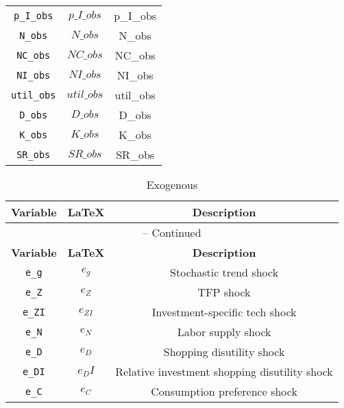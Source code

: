 \begin{center}
\begin{longtable}{ccc}
\texttt{p\_I\_obs} & $p\_I\_obs$ & p\_I\_obs\\
\texttt{N\_obs} & $N\_obs$ & N\_obs\\
\texttt{NC\_obs} & $NC\_obs$ & NC\_obs\\
\texttt{NI\_obs} & $NI\_obs$ & NI\_obs\\
\texttt{util\_obs} & $util\_obs$ & util\_obs\\
\texttt{D\_obs} & $D\_obs$ & D\_obs\\
\texttt{K\_obs} & $K\_obs$ & K\_obs\\
\texttt{SR\_obs} & $SR\_obs$ & SR\_obs\\
\hline%
\end{longtable}
\end{center}
\begin{center}
\begin{longtable}{ccc}
\caption{Exogenous}\\%
\hline%
\multicolumn{1}{c}{\textbf{Variable}} &
\multicolumn{1}{c}{\textbf{\LaTeX}} &
\multicolumn{1}{c}{\textbf{Description}}\\%
\hline\hline%
\endfirsthead
\multicolumn{3}{c}{{\tablename} \thetable{} -- Continued}\\%
\hline%
\multicolumn{1}{c}{\textbf{Variable}} &
\multicolumn{1}{c}{\textbf{\LaTeX}} &
\multicolumn{1}{c}{\textbf{Description}}\\%
\hline\hline%
\endhead
\texttt{e\_g} & ${e_g}$ & Stochastic trend shock\\
\texttt{e\_Z} & ${e_Z}$ & TFP shock\\
\texttt{e\_ZI} & ${e_{ZI}}$ & Investment-specific tech shock\\
\texttt{e\_N} & ${e_N}$ & Labor supply shock\\
\texttt{e\_D} & ${e_D}$ & Shopping disutility shock\\
\texttt{e\_DI} & ${e_DI}$ & Relative investment shopping disutility shock\\
\texttt{e\_C} & ${e_C}$ & Consumption preference shock\\
\hline%
\end{longtable}
\end{center}
